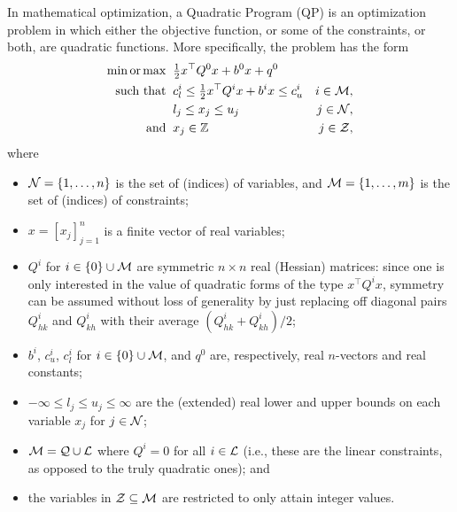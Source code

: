 In mathematical optimization, a Quadratic Program (QP) is an optimization problem in which either the objective function, or some of the constraints, or both, are quadratic functions. More specifically, the problem has the form
%
\begin{align*}
 \min \textrm{or} \max \;\;
 & {\textstyle \frac{1}{2}} x^\top Q^0 x + b^0 x + q^0 \\
 \textrm{such that}\;\;
 & c^i_l \leq {\textstyle \frac{1}{2}} x^\top Q^i x + b^i x \leq c^i_u & i \in \mathcal{M}, \\
 & l_j \leq x_j \leq u_j & j \in \mathcal{N},  \\
 \textrm{and}\;\;
 & x_j \in \mathbb{Z} & j \in \mathcal{Z},
\end{align*}
%
%
where
%
\begin{itemize}
 \item $\mathcal{N} = \{ 1, \ldots, n \}$ is the set of (indices) of variables, and $\mathcal{M} = \{ 1, \ldots, m \}$ is the set of (indices) of constraints;
 \item $x = [x_j]_{j = 1}^n$ %
is a finite vector of real variables;
 \item $Q^i$ for $i \in \{ 0 \} \cup \mathcal{M}$ are symmetric $n \times n$ real (Hessian) matrices: since one is only interested in the value of quadratic forms of the type $x^\top Q^i x$, symmetry can be assumed without loss of generality by just replacing off diagonal pairs $Q^i_{hk}$ and $Q^i_{kh}$ with their average $(Q^i_{hk} + Q^i_{kh}) / 2$;
 \item $b^i$, $c_u^i$, $c_l^i$ for $i \in \{ 0 \} \cup \mathcal{M}$, and $q^0$ are, respectively, real $n$-vectors and real constants;
 \item $-\infty \leq l_j \leq u_j \leq \infty$ are the (extended) real lower and upper bounds on each variable $x_j$ for $j \in \mathcal{N}$;
 \item $\mathcal{M} = \mathcal{Q} \cup \mathcal{L}$ where $Q^i = 0$ for all $i \in \mathcal{L}$ (i.e., these are the linear constraints, as opposed to the truly quadratic ones); and
 \item the variables in $\mathcal{Z} \subseteq \mathcal{M}$ are restricted to only attain integer values.
\end{itemize}

